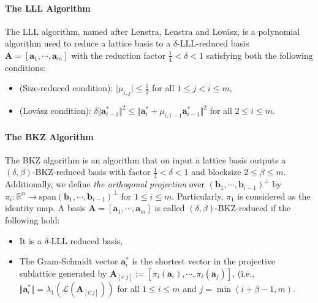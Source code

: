 \documentclass{cta-author}
\begin{document}
\paragraph{The LLL Algorithm} The LLL algorithm, named after Lenstra, Lenstra and Lov{\'a}sz, is a polynomial algorithm used to reduce a lattice basis to a $\delta$-LLL-reduced basis $\mathbf{A}=[\mathbf{a}_1, \cdots, \mathbf{a}_m]$  with the reduction factor $\frac{1}{4} <\delta <1$ satisfying both the following conditions:
\begin{itemize}
	\item (Size-reduced condition): $\vert \mu_{i,j} \vert \leq \frac{1}{2}$ for all $1\leq j<i \leq m,$
	\item (Lov{\'a}sz condition): $\delta \Vert \mathbf{a}^{*}_{i-1} \Vert^2 \leq \Vert \mathbf{a}^{*}_{i}+  \mu_{i,i-1} \mathbf{a}^{*}_{i-1}\Vert^2$ for all $2 \leq i \leq m.$
\end{itemize}
\paragraph{The BKZ Algorithm} The BKZ algorithm is an algorithm that on input a lattice basis outputs a $(\delta, \beta)$-BKZ-reduced basis with factor $\frac{1}{4} <\delta <1$ and blocksize $2 \leq \beta \leq m$. Additionally, we define \textit{the orthogonal
	projection} over $(\mathbf{b}_1, \cdots, \mathbf{b}_{i-1})^{\bot}$ by $\pi_i: \mathbb{R}^n \rightarrow \text{span}(\mathbf{b}_1, \cdots, \mathbf{b}_{i-1})^{\bot}$ for $1 \leq i \leq m$. Particularly, $\pi_1$ is considered as the identity map.
A basis $\mathbf{A}=[\mathbf{a}_1, \cdots, \mathbf{a}_m]$ is called $(\delta, \beta)$-BKZ-reduced if the following hold:
\begin{itemize}
	\item It is a $\delta$-LLL reduced basis,
	\item The Gram-Schmidt vector $\mathbf{a}^{*}_{i}$ is the shortest vector in the projective sublattice generated by  $\mathbf{A}_{[i:j]}:=[\pi_i(\mathbf{a}_{i}), \cdots, \pi_i(\mathbf{a}_{j})]$, (i.e.,  $\Vert \mathbf{a}^{*}_{i} \Vert=\lambda_1(\mathcal{L}(\mathbf{A}_{[i:j]}))$ for all $1 \leq i \leq m$ and $j=\min(i+\beta-1,m)$.
\end{itemize} 
\end{document}
